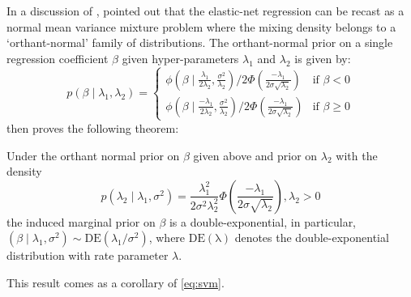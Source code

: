 \documentclass[letterpaper,11pt]{article}
\begin{document}
\begin{remark}
In a discussion of \citet{polson2011data}, \citet{hans2011comment} pointed out that the elastic-net regression can be recast as a normal mean variance mixture problem where the mixing density belongs to a `orthant-normal' family of distributions. The orthant-normal prior on a single regression coefficient $\beta$ given hyper-parameters $\lambda_1$ and $\lambda_2$ is given by: 
\[
p (\beta \mid \lambda_1, \lambda_2)  = 
  \begin{cases} 
   \phi(\beta \mid \frac{\lambda_1}{2\lambda_2}, \frac{\sigma^2}{\lambda_2}) / 2\Phi(\frac{-\lambda_1}{2\sigma\sqrt{\lambda_2}}) & \text{if } \beta < 0 \\
   \phi(\beta \mid \frac{-\lambda_1}{2\lambda_2}, \frac{\sigma^2}{\lambda_2}) / 2\Phi(\frac{-\lambda_1}{2\sigma\sqrt{\lambda_2}})       & \text{if } \beta \geq 0
  \end{cases} \label{eq:hans}
\]
\citet{hans2011comment} then proves the following theorem: 
\begin{theorem}
Under the orthant normal prior on $\beta$ given above and prior on $\lambda_2$ with the density
$$
p(\lambda_2 \mid \lambda_1, \sigma^2) = \frac{\lambda_1^2}{2\sigma^2\lambda_2^2} \Phi \left( \frac{-\lambda_1}{2\sigma \sqrt{\lambda_2}} \right), \lambda_2 > 0 
$$
the induced marginal prior on $\beta$ is a double-exponential, in particular, $(\beta \mid \lambda_1, \sigma^2) \sim \mathrm{DE}(\lambda_1/\sigma^2)$, where $\mathrm{DE(\lambda)}$ denotes the double-exponential distribution with rate parameter $\lambda$. 
\end{theorem}
This result comes as a corollary of \eqref{eq:svm}. 

\end{remark}
\end{document}
